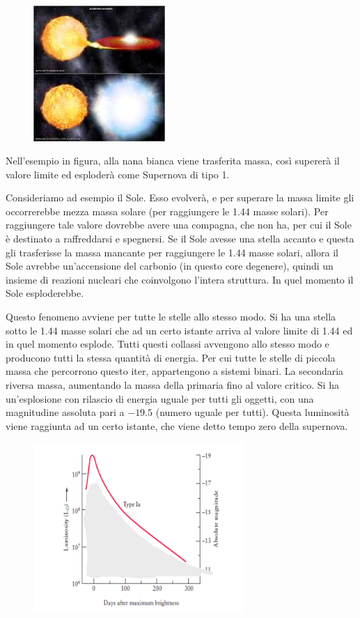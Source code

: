\begin{figure}[H]
        \centering
        \includegraphics[width=5cm]{lezione 28 novembre/trasferimentomassa.png}
        \label{lezione 28 novembre/trasferimentomassa.png}
    \end{figure}

Nell'esempio in figura, alla nana bianca viene trasferita massa, così supererà il valore limite ed esploderà come Supernova di tipo 1.

Consideriamo ad esempio il Sole. Esso evolverà, e per superare la massa limite gli occorrerebbe mezza massa solare (per raggiungere le 1.44 masse solari). Per raggiungere tale valore dovrebbe avere una compagna, che non ha, per cui il Sole è destinato a raffreddarsi e spegnersi. Se il Sole avesse una stella accanto e questa gli trasferisse la massa mancante per raggiungere le 1.44 masse solari, allora il Sole avrebbe un'accensione del carbonio (in questo core degenere), quindi un insieme di reazioni nucleari che coinvolgono l'intera struttura. In quel momento il Sole esploderebbe.

Questo fenomeno avviene per tutte le stelle allo stesso modo. Si ha una stella sotto le 1.44 masse solari che ad un certo istante arriva al valore limite di 1.44 ed in quel momento esplode. Tutti questi collassi avvengono allo stesso modo e producono tutti la stessa quantità di energia. Per cui tutte le stelle di piccola massa che percorrono questo iter, appartengono a sistemi binari. La secondaria riversa massa, aumentando la massa della primaria fino al valore critico. Si ha un'esplosione con rilascio di energia uguale per tutti gli oggetti, con una magnitudine assoluta pari a $-19.5$ (numero uguale per tutti). Questa luminosità viene raggiunta ad un certo istante, che viene detto tempo zero della supernova.

\begin{figure}[H]
    \centering
    \includegraphics[width=8cm]{lezione 28 novembre/supernovatipouno1.png}
    \label{lezione 28 novembre/supernovatipouno1.png}
\end{figure}

